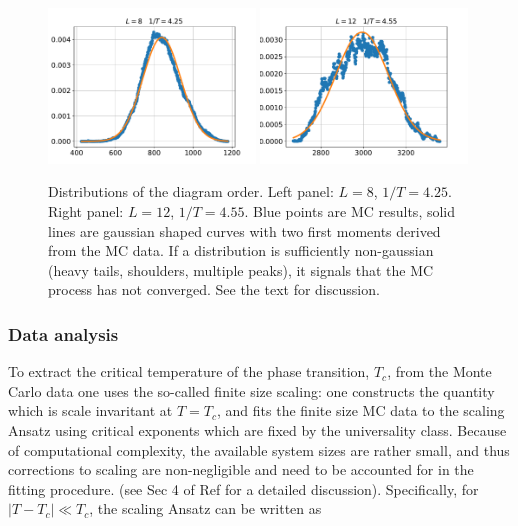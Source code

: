 \begin{figure}
\includegraphics[width=0.49\textwidth, keepaspectratio=True]{nmnm_m52L8b425.pdf}
\includegraphics[width=0.49\textwidth, keepaspectratio=True]{nmnm_m52L12b455.pdf}
%
\caption{Distributions of the diagram order. Left panel: $L=8$, $1/T = 4.25$.
Right panel: $L=12$, $1/T = 4.55$. Blue points are MC results, solid lines
are gaussian shaped curves with two first moments derived from the MC data.
If a distribution is sufficiently non-gaussian (heavy tails, shoulders,
multiple peaks), it signals that the MC process has not converged. See the text
for discussion.
\label{fig:nmnm}
}
\end{figure}



\subsubsection{Data analysis}

To extract the critical temperature of the phase transition, $T_c$, from the Monte Carlo
data one uses the so-called finite size scaling: one constructs the quantity which
is scale invaritant at $T = T_c$, and fits the finite size MC data to the scaling
Ansatz using critical exponents which are fixed by the universality class.
Because of computational complexity, the available system sizes are rather small,
and thus corrections to scaling are non-negligible and need to be accounted for
in the fitting procedure. (see Sec 4 of Ref \cite{NJP:2006} for a detailed discussion).
Specifically, for $|T - T_c| \ll T_c$, the scaling Ansatz can be written as

